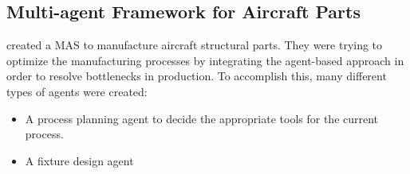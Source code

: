 \subsection{Multi-agent Framework for Aircraft Parts}

\citeauthor{6221793} \cite{6221793} created a MAS to manufacture aircraft structural parts. They were trying to optimize the manufacturing processes by integrating the agent-based approach in order to resolve bottlenecks in production. To accomplish this, many different types of agents were created:

\begin{itemize}
	\item A process planning agent to decide the appropriate tools for the current process.
	\item A fixture design agent 
\end{itemize}